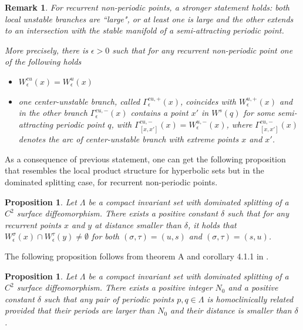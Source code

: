 \documentclass[a4paper,11pt]{article}
\newtheorem{proposition}[lemma]{Proposition}
\newtheorem{remark}[lemma]{Remark}
\theoremstyle{definition}
\def\La{\Lambda}
\def\e{\epsilon}
\def\eps{\epsilon}
\def\Ga{\Gamma}
\def\de{\delta}
\def\La{\Lambda}
\def\eps{\epsilon}
\def\Ga{\Gamma}
\def\si{\sigma}
\begin{document}
\begin{remark} For recurrent non-periodic points, a stronger statement holds: both local unstable branches are ``large", or at least one is large and the other extends to an intersection with the stable manifold of a semi-attracting periodic point.

 More precisely, there is $\e>0$ such that for any recurrent non-periodic point one of the following holds
 
 \begin{itemize}
     \item[--] $W^{cu}_{\e}(x)=W^{u}_{\e}(x)$

     \item[--] one center-unstable branch, called $\Ga^{cu,+}_{\e}(x)$, coincides with $W^{u,+}_{\e}(x)$ and in the other branch $\Ga^{cu,-}_{\e}(x)$ contains a point $x'$ in $ W^s(q)$ for some   semi-attracting periodic point $q$, with $\Ga^{cu,-}_{[x, x']}(x)= W^{u,-}_{\e}(x)$, where $\Ga^{cu,-}_{[x, x']}(x)$ denotes the arc of center-unstable branch with extreme points $x$ and $x'$.   
 \end{itemize} 
    
\end{remark}





As a consequence of previous statement, one can get the following proposition that resembles the local product structure for hyperbolic sets but in the dominated splitting  case, for recurrent non-periodic points.






\begin{proposition}\label{prop:LPE} Let $\La$ be a compact invariant  set with dominated splitting  of a $C^2$ surface diffeomorphism. There exists a positive constant $\de$ such that for  any recurrent points   $x$ and $y$ at distance smaller than  $\de$, it holds that $W^{\si}_\eps(x)\cap W^{\tau}_\eps(y)\neq \emptyset$ for both $(\si,\tau)=(u,s)$ and $(\si, \tau)=(s,u)$.

\end{proposition}






The following proposition follows from theorem A and corollary 4.1.1 in \cite{PS2}.

\begin{proposition}\label{PS2-1} Let $\La$ be a compact invariant set with dominated splitting  of a $C^2$ surface diffeomorphism. There exists a positive integer $N_0$ and a positive constant $\de$ such that any pair of periodic points $p, q\in \La$ is homoclinically related provided that their periods are larger than $N_0$ and their distance is smaller than  $\de$.
    
\end{proposition}
\end{document}
